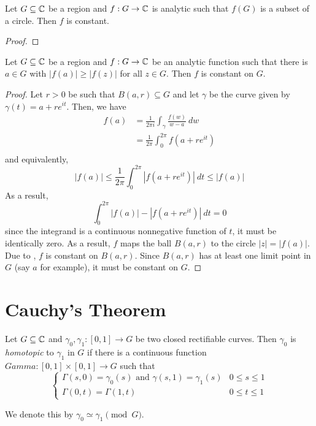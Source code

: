\begin{lemma}
    Let $G\subseteq\mathbb{C}$ be a region and $f: G\to\mathbb{C}$ is analytic such that $f(G)$ is a subset of a circle. Then $f$ is constant.
\end{lemma}
\begin{proof}
    
\end{proof}

\begin{theorem}
    Let $G\subseteq\mathbb{C}$ be a region and $f: G\to\mathbb{C}$ be an analytic function such that there is $a\in G$ with $|f(a)|\ge|f(z)|$ for all $z\in G$. Then $f$ is constant on $G$.
\end{theorem}
\begin{proof}
    Let $r > 0$ be such that $B(a,r)\subseteq G$ and let $\gamma$ be the curve given by $\gamma(t) = a + re^{it}$. Then, we have 
    \begin{align*}
        f(a) &= \frac{1}{2\pi i}\int_{\gamma}\frac{f(w)}{w - a}~dw\\
        &= \frac{1}{2\pi}\int_{0}^{2\pi}{f(a + re^{it})}\\
    \end{align*}
    and equivalently, 
    \begin{equation*}
        |f(a)|\le\frac{1}{2\pi}\int_{0}^{2\pi}|f(a + re^{it})|~dt\le|f(a)|
    \end{equation*}
    As a result,
    \begin{equation*}
        \int_{0}^{2\pi}|f(a)| - |f(a + re^{it})|~dt = 0
    \end{equation*}
    since the integrand is a continuous nonnegative function of $t$, it must be identically zero. As a result, $f$ maps the ball $B(a,r)$ to the circle $|z| = |f(a)|$. Due to , $f$ is constant on $B(a,r)$. Since $B(a,r)$ has at least one limit point in $G$ (say $a$ for example), it must be constant on $G$.
\end{proof}

\section{Cauchy's Theorem}

\begin{definition}
    Let $G\subseteq\mathbb{C}$ and $\gamma_0,\gamma_1: [0,1]\to G$ be two closed rectifiable curves. Then $\gamma_0$ is \textit{homotopic} to $\gamma_1$ in $G$ if there is a continuous function $Gamma:[0,1]\times[0,1]\to G$ such that 
    \begin{equation*}
        \begin{cases}
            \Gamma(s,0) = \gamma_0(s)\text{ and }\gamma(s,1) = \gamma_1(s) & 0\le s\le 1\\
            \Gamma(0,t) = \Gamma(1,t) & 0\le t\le 1
        \end{cases}
    \end{equation*}

    We denote this by $\gamma_0\simeq\gamma_1\pmod G$.
\end{definition}

